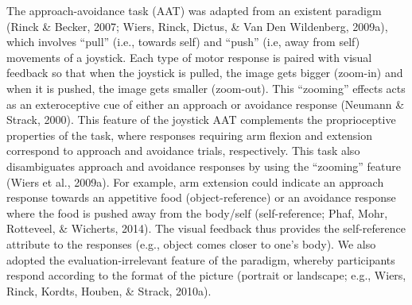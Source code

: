 \documentclass[man,floatsintext]{apa6}
\begin{document}
The approach-avoidance task (AAT) was adapted from an existent paradigm
(Rinck \& Becker, 2007; Wiers, Rinck, Dictus, \& Van Den Wildenberg,
2009a), which involves \enquote{pull} (i.e., towards self) and
\enquote{push} (i.e, away from self) movements of a joystick. Each type
of motor response is paired with visual feedback so that when the
joystick is pulled, the image gets bigger (zoom-in) and when it is
pushed, the image gets smaller (zoom-out). This \enquote{zooming}
effects acts as an exteroceptive cue of either an approach or avoidance
response (Neumann \& Strack, 2000). This feature of the joystick AAT
complements the proprioceptive properties of the task, where responses
requiring arm flexion and extension correspond to approach and avoidance
trials, respectively. This task also disambiguates approach and
avoidance responses by using the \enquote{zooming} feature (Wiers et
al., 2009a). For example, arm extension could indicate an approach
response towards an appetitive food (object-reference) or an avoidance
response where the food is pushed away from the body/self
(self-reference; Phaf, Mohr, Rotteveel, \& Wicherts, 2014). The visual
feedback thus provides the self-reference attribute to the responses
(e.g., object comes closer to one's body). We also adopted the
evaluation-irrelevant feature of the paradigm, whereby participants
respond according to the format of the picture (portrait or landscape;
e.g., Wiers, Rinck, Kordts, Houben, \& Strack, 2010a).

\par
\end{document}
